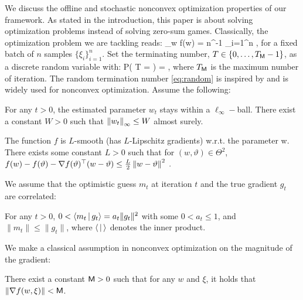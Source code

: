 \documentclass[wcp]{jmlr}
\begin{document}
We discuss the offline and stochastic nonconvex optimization properties of our framework.
As stated in the introduction, this paper is about solving optimization problems instead of solving zero-sum games.  
Classically, the optimization problem we are tackling reads:
\beq\label{eq:minproblem}
\min \limits_{w \in \Theta} f(w) \eqdef  \EE[ f(w, \xi)] = n^{-1} \sum_{i=1}^n  \EE[f(w, \xi_i)] \eqsp,
\eeq
for a fixed batch of $n$ samples $\{ \xi_i \}_{i=1}^n$.
Set the terminating number, $T \in \{0,\dots,T_{\sf M}-1\}$, as a discrete random variable with:
\beq \label{eq:random}
   P( T = \ell ) =  \eqsp,
\eeq
where $T_{\sf M}$ is the maximum number of iteration.
The random termination number \eqref{eq:random} is inspired by \citep{ghadimi2013stochastic} and is widely used for nonconvex optimization. 
Assume the following:
\begin{assumption}\label{ASS:BOUNDEDPARAM}
For any $t >0$, the estimated parameter $w_t$ stays within a $\ell_{\infty}-$ball. There exist a constant $W >0$ such that $\norm{w_t}_{\infty} \leq W$ almost surely.
\end{assumption}
\begin{assumption}\label{ass:smooth}
The function $f$ is $L$-smooth (has $L$-Lipschitz gradients) w.r.t. the parameter w.
There exists some constant $L > 0$ such that for $(w, \vartheta) \in \Theta^2$, $f(w) - f(\vartheta) - \nabla f(\vartheta)^\top(w - \vartheta) \leq \frac{L}{2} \norm{w - \vartheta}^2\eqsp.$
\end{assumption}
We assume that the optimistic guess $m_t$ at iteration $t$ and the true gradient $g_t$ are correlated:
\begin{assumption}\label{ass:guessbound}
For any $t >0$, $0 < \pscal{m_t}{ g_t} = a_t \|g_t\|^2$ with some $0<a_t\leq 1$, and $\| m_t \|\leq \| g_t \|$, where $\pscal{}{}$ denotes the inner product.
\end{assumption}

We make a classical assumption in nonconvex optimization on the magnitude of the gradient:
\begin{assumption}\label{ass:bounded}
There exist a constant $\major >0$ such that for any $w$ and $\xi$, it holds that $\norm{\nabla f(w, \xi)} < \major$.
\end{assumption}
\end{document}
